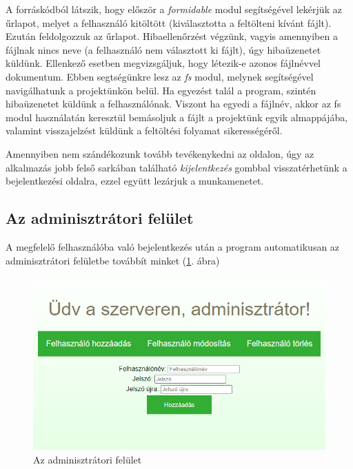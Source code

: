 A forráskódból látszik, hogy először a \textit{formidable} modul segítségével lekérjük az űrlapot, melyet a felhasználó kitöltött (kiválasztotta a feltölteni kívánt fájlt). Ezután feldolgozzuk az űrlapot. Hibaellenőrzést végzünk, vagyis amennyiben a fájlnak nincs neve (a felhasználó nem választott ki fájlt), úgy hibaüzenetet küldünk. Ellenkező esetben megvizsgáljuk, hogy létezik-e azonos fájlnévvel dokumentum. Ebben segtségünkre lesz az \textit{fs} modul, melynek segítségével navigálhatunk a projektünkön belül. Ha egyezést talál a program, szintén hibaüzenetet küldünk a felhasználónak. Viszont ha egyedi a fájlnév, akkor az fs modul használatán keresztül bemásoljuk a fájlt a projektünk egyik almappájába, valamint visszajelzést küldünk a feltöltési folyamat sikerességéről.

Amennyiben nem szándékozunk tovább tevékenykedni az oldalon, úgy az alkalmazás jobb felső sarkában található \textit{kijelentkezés} gombbal visszatérhetünk a bejelentkezési oldalra, ezzel együtt lezárjuk a munkamenetet.


\subsection{Az adminisztrátori felület}

A megfelelő felhasználóba való bejelentkezés után a program automatikusan az adminisztrátori felületbe továbbít minket (\ref{fig:admin}. ábra)

\begin{figure}[h]
	\centering
		\includegraphics[width=12truecm, height=7truecm]{images/admin_oldal.png}
	\caption{Az adminisztrátori felület}
	\label{fig:admin}
\end{figure}

